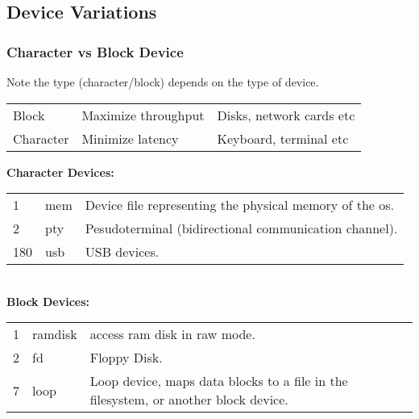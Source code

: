\documentclass{report}
\begin{document}
\subsection*{Device Variations}
\subsubsection*{Character vs Block Device}
Note the type (character/block) depends on the type of device.
\begin{center}
	\begin{tabular}{l l l}
		Block     & Maximize throughput & Disks, network cards etc \\
		Character & Minimize latency    & Keyboard, terminal etc   \\
	\end{tabular}
\end{center}
\textbf{Character Devices:}
\\ \begin{tabular}{l l l}
	1   & mem & Device file representing the physical memory of the os. \\
	2   & pty & Pesudoterminal (bidirectional communication channel).   \\
	180 & usb & USB devices.                                            \\
\end{tabular}
\\ \textbf{Block Devices:}
\\ \begin{tabular}{l l l}
	1 & ramdisk & access ram disk in raw mode.                                                        \\
	2 & fd      & Floppy Disk.                                                                        \\
	7 & loop    & Loop device, maps data blocks to a file in the filesystem, or another block device. \\
\end{tabular}
\end{document}
